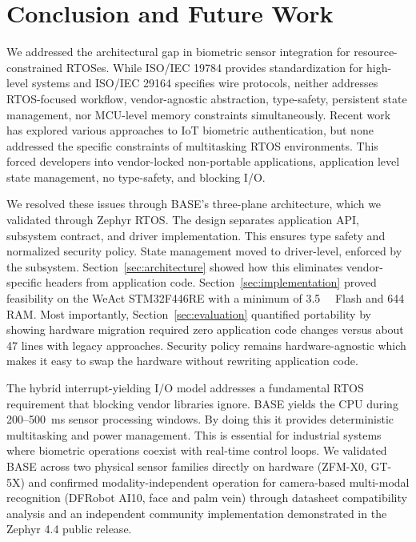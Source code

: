 \section{Conclusion and Future Work}
\label{sec:conclusion}

We addressed the architectural gap in biometric sensor integration for resource-constrained RTOSes. While ISO/IEC 19784 provides standardization for high-level systems and ISO/IEC 29164 specifies wire protocols, neither addresses RTOS-focused workflow, vendor-agnostic abstraction, type-safety, persistent state management, nor MCU-level memory constraints simultaneously. Recent work has explored various approaches to IoT biometric authentication\cite{abuhamad2021sensor,yang2021biometric}, but none addressed the specific constraints of multitasking RTOS environments. This forced developers into vendor-locked non-portable applications, application level state management, no type-safety, and blocking I/O.

We resolved these issues through BASE's three-plane architecture, which we validated through Zephyr RTOS. The design separates application API, subsystem contract, and driver implementation. This ensures type safety and normalized security policy. State management moved to driver-level, enforced by the subsystem. Section~\ref{sec:architecture} showed how this eliminates vendor-specific headers from application code. Section~\ref{sec:implementation} proved feasibility on the WeAct STM32F446RE with a minimum of \SI{3.5}{\kilo\byte} Flash and \SI{644}{\byte} RAM. Most importantly, Section~\ref{sec:evaluation} quantified portability by showing hardware migration required zero application code changes versus about 47 lines with legacy approaches. Security policy remains hardware-agnostic which makes it easy to swap the hardware without rewriting application code.

The hybrid interrupt-yielding I/O model addresses a fundamental RTOS requirement that blocking vendor libraries ignore. BASE yields the CPU during \num{200}--\SI{500}{\milli\second} sensor processing windows. By doing this it provides deterministic multitasking and power management. This is essential for industrial systems where biometric operations coexist with real-time control loops. We validated BASE across two physical sensor families directly on hardware (ZFM-X0, GT-5X) and confirmed modality-independent operation for camera-based multi-modal recognition (DFRobot AI10, face and palm vein) through datasheet compatibility analysis and an independent community implementation demonstrated in the Zephyr 4.4 public release\cite{zephyr_44_release}.

